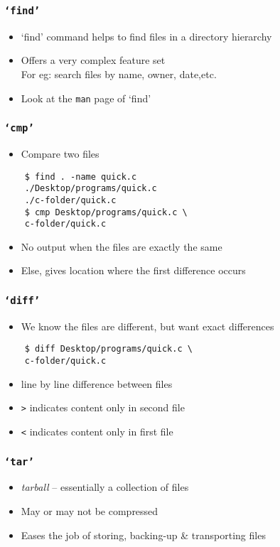 \documentclass[12pt,compress]{beamer}
\begin{document}
\begin{frame}[fragile]
  \frametitle{\texttt{`find'}}
  \begin{itemize}
  \item `find' command helps to find files in a directory hierarchy
  \item Offers a very complex feature set\\ For eg: search files by name, owner, date,etc.
  \item Look at the \texttt{man} page of `find' 
  \end{itemize}
\end{frame}

\begin{frame}[fragile]
  \frametitle{\texttt{`cmp'}}
  \begin{itemize}
  \item Compare two files
  \end{itemize}
  \begin{lstlisting}
    $ find . -name quick.c
    ./Desktop/programs/quick.c
    ./c-folder/quick.c
    $ cmp Desktop/programs/quick.c \
    c-folder/quick.c
  \end{lstlisting} %
  \begin{itemize}
  \item No output when the files are exactly the same
  \item Else, gives location where the first difference occurs 
  \end{itemize}
\end{frame}

\begin{frame}[fragile]
  \frametitle{\texttt{`diff'}}
  \begin{itemize}
  \item We know the files are different, but want exact differences
  \end{itemize}
  \begin{lstlisting}
    $ diff Desktop/programs/quick.c \
    c-folder/quick.c
  \end{lstlisting} %
  \begin{itemize}
  \item line by line difference between files
  \item \texttt{>} indicates content only in second file
  \item \texttt{<} indicates content only in first file
  \end{itemize}
\end{frame}

\begin{frame}[fragile]
\frametitle{\texttt{`tar'}}
\begin{itemize}
\item \emph{tarball} -- essentially a collection of files
\item May or may not be compressed
\item Eases the job of storing, backing-up \& transporting files
\end{itemize}
\end{frame}
\end{document}
